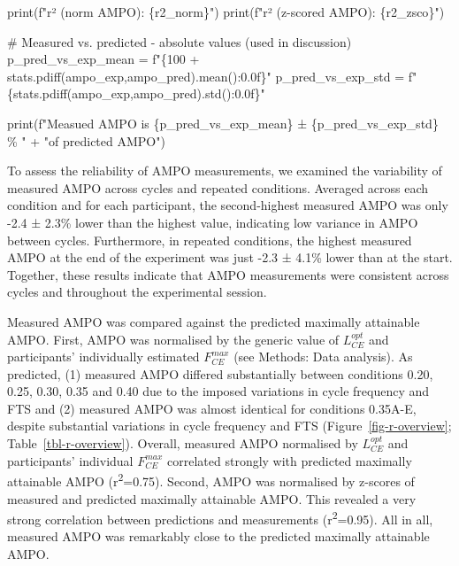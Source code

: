 \documentclass[
  11pt,
  a4paper]{article}
\newenvironment{Shaded}{\begin{snugshade}}{\end{snugshade}}
\newcommand{\BuiltInTok}[1]{\textcolor[rgb]{0.00,0.23,0.31}{#1}}
\newcommand{\CommentTok}[1]{\textcolor[rgb]{0.37,0.37,0.37}{#1}}
\newcommand{\DecValTok}[1]{\textcolor[rgb]{0.68,0.00,0.00}{#1}}
\newcommand{\NormalTok}[1]{\textcolor[rgb]{0.00,0.23,0.31}{#1}}
\newcommand{\OperatorTok}[1]{\textcolor[rgb]{0.37,0.37,0.37}{#1}}
\newcommand{\SpecialCharTok}[1]{\textcolor[rgb]{0.37,0.37,0.37}{#1}}
\newcommand{\SpecialStringTok}[1]{\textcolor[rgb]{0.13,0.47,0.30}{#1}}
\newcommand{\StringTok}[1]{\textcolor[rgb]{0.13,0.47,0.30}{#1}}
\begin{document}
\begin{Shaded}
\begin{Highlighting}[]
\BuiltInTok{print}\NormalTok{(}\SpecialStringTok{f"r² (norm AMPO): }\SpecialCharTok{\{}\NormalTok{r2\_norm}\SpecialCharTok{\}}\SpecialStringTok{"}\NormalTok{)}
\BuiltInTok{print}\NormalTok{(}\SpecialStringTok{f"r² (z{-}scored AMPO): }\SpecialCharTok{\{}\NormalTok{r2\_zsco}\SpecialCharTok{\}}\SpecialStringTok{"}\NormalTok{)}

\CommentTok{\# Measured vs. predicted {-} absolute values (used in discussion)}
\NormalTok{p\_pred\_vs\_exp\_mean }\OperatorTok{=} \SpecialStringTok{f"}\SpecialCharTok{\{}\DecValTok{100} \OperatorTok{+}\NormalTok{ stats}\SpecialCharTok{.}\NormalTok{pdiff(ampo\_exp,ampo\_pred)}\SpecialCharTok{.}\NormalTok{mean()}\SpecialCharTok{:0.0f\}}\SpecialStringTok{"}
\NormalTok{p\_pred\_vs\_exp\_std  }\OperatorTok{=} \SpecialStringTok{f"}\SpecialCharTok{\{}\NormalTok{stats}\SpecialCharTok{.}\NormalTok{pdiff(ampo\_exp,ampo\_pred)}\SpecialCharTok{.}\NormalTok{std()}\SpecialCharTok{:0.0f\}}\SpecialStringTok{"}

\BuiltInTok{print}\NormalTok{(}\SpecialStringTok{f"Measued AMPO is }\SpecialCharTok{\{}\NormalTok{p\_pred\_vs\_exp\_mean}\SpecialCharTok{\}}\SpecialStringTok{ ± }\SpecialCharTok{\{}\NormalTok{p\_pred\_vs\_exp\_std}\SpecialCharTok{\}}\SpecialStringTok{ \% "} \OperatorTok{+}
      \StringTok{"of predicted AMPO"}\NormalTok{)}
\end{Highlighting}
\end{Shaded}

To assess the reliability of AMPO measurements, we examined the
variability of measured AMPO across cycles and repeated conditions.
Averaged across each condition and for each participant, the
second-highest measured AMPO was only -2.4 ± 2.3\% lower than the
highest value, indicating low variance in AMPO between cycles.
Furthermore, in repeated conditions, the highest measured AMPO at the
end of the experiment was just -2.3 ± 4.1\% lower than at the start.
Together, these results indicate that AMPO measurements were consistent
across cycles and throughout the experimental session.

Measured AMPO was compared against the predicted maximally attainable
AMPO. First, AMPO was normalised by the generic value of
\(L_{CE}^{opt}\) and participants' individually estimated
\(F_{CE}^{max}\) (see Methods: Data analysis). As predicted, (1)
measured AMPO differed substantially between conditions 0.20, 0.25,
0.30, 0.35 and 0.40 due to the imposed variations in cycle frequency and
FTS and (2) measured AMPO was almost identical for conditions 0.35A-E,
despite substantial variations in cycle frequency and FTS
(Figure~\ref{fig-r-overview}; Table~\ref{tbl-r-overview}). Overall,
measured AMPO normalised by \(L_{CE}^{opt}\) and participants'
individual \(F_{CE}^{max}\) correlated strongly with predicted maximally
attainable AMPO (r\textsuperscript{2}=0.75). Second, AMPO was normalised
by z-scores of measured and predicted maximally attainable AMPO. This
revealed a very strong correlation between predictions and measurements
(r\textsuperscript{2}=0.95). All in all, measured AMPO was remarkably
close to the predicted maximally attainable AMPO.
\end{document}
